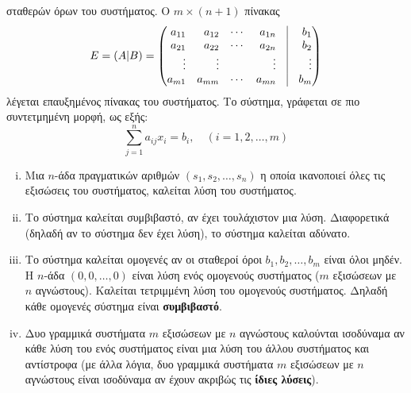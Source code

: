 \begin{dfn}
{  σταθερών} όρων του συστήματος. Ο $ m \times (n+1) $ πίνακας 
  \[ 
    E = (A|B) = 
    \begin{pmatrix*}[r]
      a_{11} & a_{12} & \cdots & a_{1n} & \vrule &  b_{1} \\
      a_{21} & a_{22} & \cdots & a_{2n} &\vrule &  b_{2} \\
      \vdots & \vdots & & \vdots & \vrule & \vdots \\
      a_{m1} & a_{mm} & \cdots & a_{mn} & \vrule &  b_{m} \\
  \end{pmatrix*}
  \] 
  λέγεται \textcolor{Col1}{επαυξημένος} πίνακας του συστήματος. Το σύστημα, 
  γράφεται σε πιο συντετμημένη μορφή, ως εξής:
  \[
    \sum_{j=1}^{n} a_{ij} x_{i} = b_{i}, \quad (i=1,2,\ldots, m)
  \]
\end{dfn}

\begin{dfn}
\item {}
  \begin{enumerate}[i)]
    \item Μια $n$-άδα πραγματικών αριθμών $ (s_{1},s_{2}, \ldots, s_{n}) $ η οποία 
      ικανοποιεί όλες τις εξισώσεις του συστήματος, καλείται \textcolor{Col1}{λύση} 
      του συστήματος.
    \item Το σύστημα καλείται \textcolor{Col1}{συμβιβαστό}, αν έχει τουλάχιστον μια 
      λύση. Διαφορετικά (δηλαδή αν το σύστημα δεν έχει λύση), το σύστημα καλείται
      \textcolor{Col1}{αδύνατο}.
    \item Το σύστημα καλείται \textcolor{Col1}{ομογενές} αν οι σταθεροί όροι 
      $ b_{1}, b_{2}, \ldots, b_{m} $ είναι όλοι μηδέν. Η $n$-άδα $ (0,0,\ldots, 0) $ 
      είναι λύση ενός ομογενούς συστήματος ($m$ εξισώσεων με $n$ αγνώστους). 
      Καλείται \textcolor{Col1}{τετριμμένη} λύση του ομογενούς συστήματος. 
      Δηλαδή κάθε ομογενές σύστημα είναι \textbf{συμβιβαστό}.
    \item Δυο γραμμικά συστήματα $m$ εξισώσεων με $n$ αγνώστους καλούνται 
      \textcolor{Col1}{ισοδύναμα} αν κάθε λύση του ενός συστήματος είναι μια λύση του 
      άλλου συστήματος και αντίστροφα (με άλλα λόγια, δυο γραμμικά συστήματα $m$ 
      εξισώσεων με $n$ αγνώστους είναι ισοδύναμα αν έχουν ακριβώς τις \textbf{ίδιες
      λύσεις}).
  \end{enumerate}
\end{dfn}

